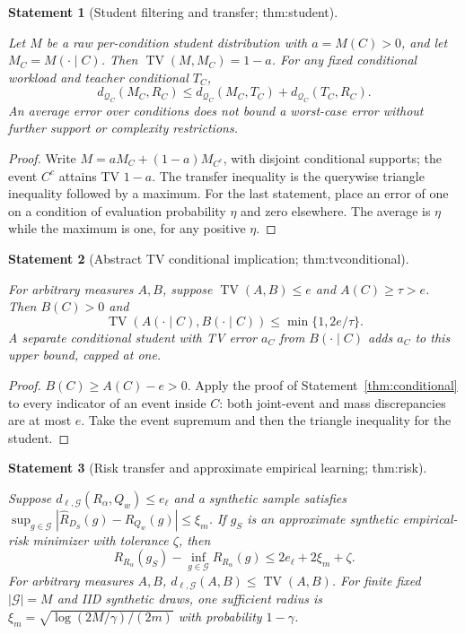 \documentclass[11pt]{article}
\newtheorem{statement}{Statement}
\newcommand{\Q}{\mathcal Q}\newcommand{\Z}{\mathcal Z}\newcommand{\W}{\mathcal W}
\newcommand{\TV}{\operatorname{TV}}\newcommand{\KL}{\operatorname{KL}}
\begin{document}
\begin{statement}[Student filtering and transfer; thm:student]\label{thm:student}

Let $M$ be a raw per-condition student distribution with $a=M(C)>0$, and let $M_C=M(\cdot\mid C)$. Then $\TV(M,M_C)=1-a$. For any fixed conditional workload and teacher conditional $T_C$,
\begin{equation}
d_{\Q_C}(M_C,R_C)\le
d_{\Q_C}(M_C,T_C)+d_{\Q_C}(T_C,R_C).
\end{equation}
An average error over conditions does not bound a worst-case error without further support or complexity restrictions.

\end{statement}

\begin{proof}
Write $M=aM_C+(1-a)M_{C^c}$, with disjoint conditional supports; the event $C^c$ attains TV $1-a$. The transfer inequality is the querywise triangle inequality followed by a maximum. For the last statement, place an error of one on a condition of evaluation probability $\eta$ and zero elsewhere. The average is $\eta$ while the maximum is one, for any positive $\eta$.
\end{proof}

\begin{statement}[Abstract TV conditional implication; thm:tvconditional]\label{thm:tvconditional}

For arbitrary measures $A,B$, suppose $\TV(A,B)\le e$ and $A(C)\ge\tau>e$. Then $B(C)>0$ and
\begin{equation}
\TV(A(\cdot\mid C),B(\cdot\mid C))\le\min\{1,2e/\tau\}.
\end{equation}
A separate conditional student with TV error $a_C$ from $B(\cdot\mid C)$ adds $a_C$ to this upper bound, capped at one.

\end{statement}

\begin{proof}
$B(C)\ge A(C)-e>0$. Apply the proof of Statement~\ref{thm:conditional} to every indicator of an event inside $C$: both joint-event and mass discrepancies are at most $e$. Take the event supremum and then the triangle inequality for the student.
\end{proof}

\begin{statement}[Risk transfer and approximate empirical learning; thm:risk]\label{thm:risk}

Suppose $d_{\ell,\mathcal G}(R_\alpha,Q_w)\le e_\ell$ and a synthetic sample satisfies
$\sup_{g\in\mathcal G}|\widehat R_{D_S}(g)-R_{Q_w}(g)|\le\xi_m$.
If $g_S$ is an approximate synthetic empirical-risk minimizer with tolerance $\zeta$, then
\begin{equation}\label{eq:risk}
R_{R_\alpha}(g_S)-\inf_{g\in\mathcal G}R_{R_\alpha}(g)
\le2e_\ell+2\xi_m+\zeta.
\end{equation}
For arbitrary measures $A,B$, $d_{\ell,\mathcal G}(A,B)\le\TV(A,B)$. For finite fixed $|\mathcal G|=M$ and IID synthetic draws, one sufficient radius is $\xi_m=\sqrt{\log(2M/\gamma)/(2m)}$ with probability $1-\gamma$.

\end{statement}
\end{document}
